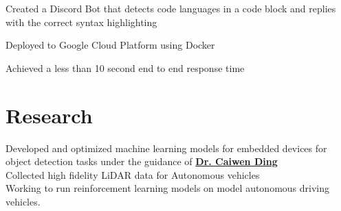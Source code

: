 \documentclass[]{resume-template}
\begin{document}
\begin{minipage}[t]{0.66\textwidth}
        \label{subsec:neatbot}
        \begin{tightemize}
            \item Created a Discord Bot that detects code languages in a code block and replies with the correct syntax highlighting
            \item Deployed to Google Cloud Platform using Docker
            \item Achieved a less than 10 second end to end response time
        \end{tightemize}




        \sectionsep{}



        \section{Research}\label{sec:research}
        \textbullet{} Developed and optimized machine learning models for embedded devices for object detection tasks under the guidance of \textbf{\href{https://caiwending.cse.uconn.edu/}{Dr. Caiwen Ding}} \\
        \textbullet{} Collected high fidelity LiDAR data for Autonomous vehicles \\
        \textbullet{} Working to run reinforcement learning models on model autonomous driving vehicles. 


\end{minipage}
\end{document}

